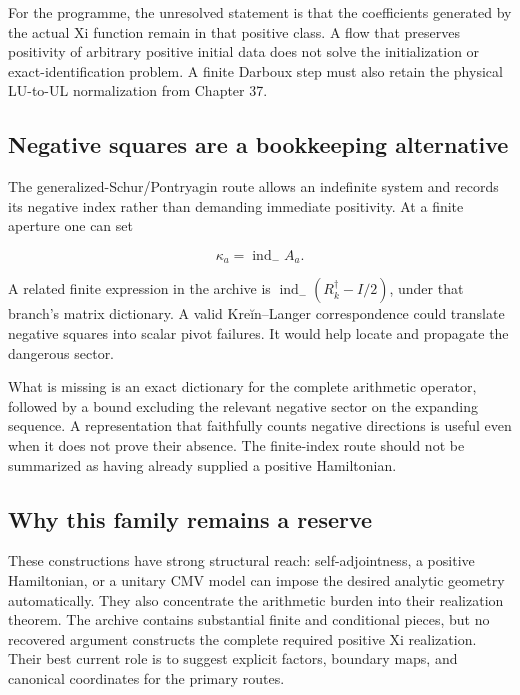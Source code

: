 \documentclass[
  10pt,
  a4paper,
  10pt,
  oneside,
  openany]{book}
\begin{document}
For the programme, the unresolved statement is that the coefficients
generated by the actual Xi function remain in that positive class. A
flow that preserves positivity of arbitrary positive initial data does
not solve the initialization or exact-identification problem. A finite
Darboux step must also retain the physical LU-to-UL normalization from
Chapter 37.

\subsection{Negative squares are a bookkeeping
alternative}\label{negative-squares-are-a-bookkeeping-alternative}

The generalized-Schur/Pontryagin route allows an indefinite system and
records its negative index rather than demanding immediate positivity.
At a finite aperture one can set

\[
 \kappa_a=\operatorname{ind}_{-}A_a.
\]

A related finite expression in the archive is
\(\operatorname{ind}_{-}(R_k^{\dagger}-I/2)\), under that branch's
matrix dictionary. A valid Kreĭn--Langer correspondence could translate
negative squares into scalar pivot failures. It would help locate and
propagate the dangerous sector.

What is missing is an exact dictionary for the complete arithmetic
operator, followed by a bound excluding the relevant negative sector on
the expanding sequence. A representation that faithfully counts negative
directions is useful even when it does not prove their absence. The
finite-index route should not be summarized as having already supplied a
positive Hamiltonian.

\subsection{Why this family remains a
reserve}\label{why-this-family-remains-a-reserve}

These constructions have strong structural reach: self-adjointness, a
positive Hamiltonian, or a unitary CMV model can impose the desired
analytic geometry automatically. They also concentrate the arithmetic
burden into their realization theorem. The archive contains substantial
finite and conditional pieces, but no recovered argument constructs the
complete required positive Xi realization. Their best current role is to
suggest explicit factors, boundary maps, and canonical coordinates for
the primary routes.
\end{document}
